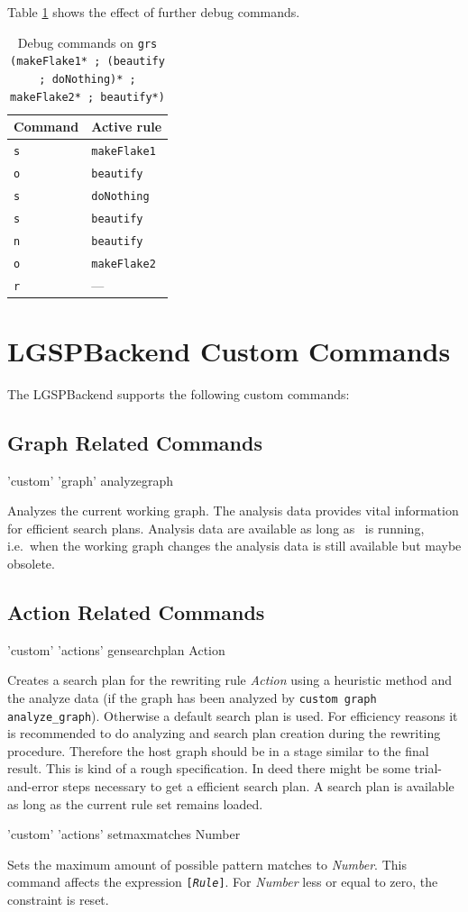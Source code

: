 \begin{example}
Table \ref{tabdebug} shows the effect of further debug commands.
\begin{table}[htbp]
  \centering
  \begin{tabular}{|l|l|} \hline
    \textbf{Command} & \textbf{Active rule} \\ \hline
    \texttt{s} & \texttt{makeFlake1} \\
    \texttt{o} & \texttt{beautify} \\
    \texttt{s} & \texttt{doNothing} \\
    \texttt{s} & \texttt{beautify} \\ 
    \texttt{n} & \texttt{beautify} \\ 
    \texttt{o} & \texttt{makeFlake2} \\
    \texttt{r} & --- \\ \hline
  \end{tabular}
  \caption{Debug commands on \texttt{grs (makeFlake1* ; (beautify ; doNothing)* ; makeFlake2* ; beautify*)}}
  \label{tabdebug}
\end{table}
\end{example}   


\section{LGSPBackend Custom Commands}
\label{custom}
The LGSPBackend supports the following custom commands:

\subsection{Graph Related Commands}
\begin{rail}
  'custom' 'graph' analyzegraph
\end{rail}
Analyzes the current working graph. The analysis data provides vital information for efficient search plans. Analysis data are available as long as \GrShell\ is running, i.e.\ when the working graph changes the analysis data is still available but maybe obsolete.

\subsection{Action Related Commands}
\begin{rail}
  'custom' 'actions' gensearchplan Action
\end{rail}
Creates a search plan for the rewriting rule \emph{Action} using a heuristic method and the analyze data (if the graph has been analyzed by \texttt{custom graph analyze\_graph}). Otherwise a default search plan is used. For efficiency reasons it is recommended to do analyzing and search plan creation during the rewriting procedure. Therefore the host graph should be in a stage similar to the final result. This is kind of a rough specification. In deed there might be some trial-and-error steps necessary to get a efficient search plan. A search plan is available as long as the current rule set remains loaded. 

\begin{rail}
  'custom' 'actions' setmaxmatches Number
\end{rail}
Sets the maximum amount of possible pattern matches to \emph{Number}. This command affects the expression \texttt{[\emph{Rule}]}. For \emph{Number} less or equal to zero, the constraint is reset.

